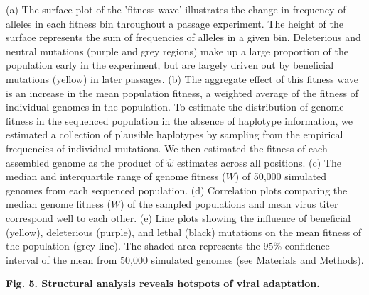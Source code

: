 \documentclass[
]{article}
\begin{document}
(a) The surface plot of the 'fitness wave' illustrates the change in
frequency of alleles in each fitness bin throughout a passage
experiment. The height of the surface represents the sum of frequencies
of alleles in a given bin. Deleterious and neutral mutations (purple and
grey regions) make up a large proportion of the population early in the
experiment, but are largely driven out by beneficial mutations (yellow)
in later passages. (b) The aggregate effect of this fitness wave is an
increase in the mean population fitness, a weighted average of the
fitness of individual genomes in the population. To estimate the
distribution of genome fitness in the sequenced population in the
absence of haplotype information, we estimated a collection of plausible
haplotypes by sampling from the empirical frequencies of individual
mutations. We then estimated the fitness of each assembled genome as the
product of \(\widehat{w}\) estimates across all positions. (c) The
median and interquartile range of genome fitness (\(W\)) of 50,000
simulated genomes from each sequenced population. (d) Correlation plots
comparing the median genome fitness (\(W\)) of the sampled populations
and mean virus titer correspond well to each other. (e) Line plots
showing the influence of beneficial (yellow), deleterious (purple), and
lethal (black) mutations on the mean fitness of the population (grey
line). The shaded area represents the 95\% confidence interval of the
mean from 50,000 simulated genomes (see Materials and Methods).

\textbf{Fig. 5. Structural analysis reveals hotspots of viral
adaptation.}
\end{document}
